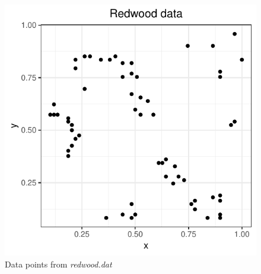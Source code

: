 \begin{figure}
    \centering
    \includegraphics[scale=0.95]{figures/prob1_redwood_points.pdf}
    \caption{Data points from \textit{redwood.dat}}
    \label{fig:redwood_points}
\end{figure}